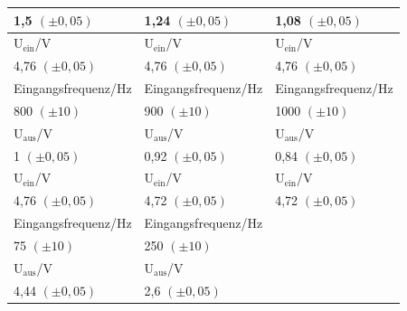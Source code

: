 \documentclass[12pt]{scrartcl}
\begin{document}
\begin{table}[H]
\begin{center}
\begin{tabular}{|l|l|l|}
1,5 $(\pm 0,05)$ & 1,24 $(\pm 0,05)$ & 1,08 $(\pm 0,05)$ \\ \hline
U$_\text{ein}$/V & U$_\text{ein}$/V & U$_\text{ein}$/V \\ \hline
4,76 $(\pm 0,05)$ & 4,76 $(\pm 0,05)$ & 4,76 $(\pm 0,05)$ \\ \hline \hline
Eingangsfrequenz/Hz & Eingangsfrequenz/Hz & Eingangsfrequenz/Hz \\ \hline
800 $(\pm 10)$ & 900 $(\pm 10)$ & 1000 $(\pm 10)$ \\ \hline
U$_\text{aus}$/V & U$_\text{aus}$/V & U$_\text{aus}$/V \\ \hline
1 $(\pm 0,05)$ & 0,92 $(\pm 0,05)$ & 0,84 $(\pm 0,05)$ \\ \hline
U$_\text{ein}$/V & U$_\text{ein}$/V & U$_\text{ein}$/V \\ \hline
4,76 $(\pm 0,05)$ & 4,72 $(\pm 0,05)$ & 4,72 $(\pm 0,05)$ \\ \hline \hline
Eingangsfrequenz/Hz & Eingangsfrequenz/Hz &  \\ \hline
75 $(\pm 10)$ & 250 $(\pm 10)$ &  \\ \hline
U$_\text{aus}$/V & U$_\text{aus}$/V &  \\ \hline
4,44 $(\pm 0,05)$ & 2,6 $(\pm 0,05)$ &  \\ \hline
\end{tabular}
\end{center}
\label{tab:2.3}
\end{table}
\end{document}
